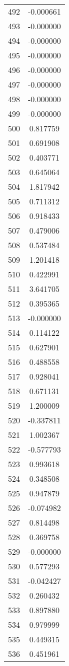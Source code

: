\documentclass[12pt]{article}
\begin{document}
\begin{longtable}{@{}cc@{}}
492 & -0.000661 \\
493 & -0.000000 \\
494 & -0.000000 \\
495 & -0.000000 \\
496 & -0.000000 \\
497 & -0.000000 \\
498 & -0.000000 \\
499 & -0.000000 \\
500 & 0.817759 \\
501 & 0.691908 \\
502 & 0.403771 \\
503 & 0.645064 \\
504 & 1.817942 \\
505 & 0.711312 \\
506 & 0.918433 \\
507 & 0.479006 \\
508 & 0.537484 \\
509 & 1.201418 \\
510 & 0.422991 \\
511 & 3.641705 \\
512 & 0.395365 \\
513 & -0.000000 \\
514 & 0.114122 \\
515 & 0.627901 \\
516 & 0.488558 \\
517 & 0.928041 \\
518 & 0.671131 \\
519 & 1.200009 \\
520 & -0.337811 \\
521 & 1.002367 \\
522 & -0.577793 \\
523 & 0.993618 \\
524 & 0.348508 \\
525 & 0.947879 \\
526 & -0.074982 \\
527 & 0.814498 \\
528 & 0.369758 \\
529 & -0.000000 \\
530 & 0.577293 \\
531 & -0.042427 \\
532 & 0.260432 \\
533 & 0.897880 \\
534 & 0.979999 \\
535 & 0.449315 \\
536 & 0.451961 \\

\end{longtable}
\end{document}
